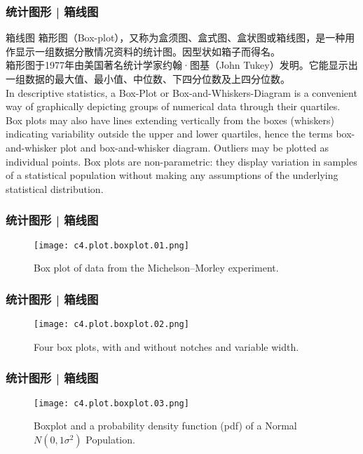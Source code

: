 \begin{frame}
  \frametitle{统计图形 | 箱线图}
  \begin{block}{箱线图}
    箱形图（Box-plot），又称为盒须图、盒式图、盒状图或箱线图，是一种用作显示一组数据分散情况资料的统计图。因型状如箱子而得名。\\
    \vspace{0.5em}
箱形图于1977年由美国著名统计学家约翰·图基（John Tukey）发明。它能显示出一组数据的最大值、最小值、中位数、下四分位数及上四分位数。\\
\vspace{0.5em}
In descriptive statistics, a Box-Plot or Box-and-Whiskers-Diagram is a convenient way of graphically depicting groups of numerical data through their quartiles. Box plots may also have lines extending vertically from the boxes (whiskers) indicating variability outside the upper and lower quartiles, hence the terms box-and-whisker plot and box-and-whisker diagram. Outliers may be plotted as individual points. Box plots are non-parametric: they display variation in samples of a statistical population without making any assumptions of the underlying statistical distribution.
  \end{block}
\end{frame}

\begin{frame}
  \frametitle{统计图形 | 箱线图}
  \begin{figure}
    \centering
    \texttt{[image: c4.plot.boxplot.01.png]}
    \caption{Box plot of data from the Michelson–Morley experiment.}
  \end{figure}
\end{frame}

\begin{frame}
  \frametitle{统计图形 | 箱线图}
  \begin{figure}
    \centering
    \texttt{[image: c4.plot.boxplot.02.png]}
    \caption{Four box plots, with and without notches and variable width.}
  \end{figure}
\end{frame}

\begin{frame}
  \frametitle{统计图形 | 箱线图}
  \begin{figure}
    \centering
    \texttt{[image: c4.plot.boxplot.03.png]}
    \caption{Boxplot and a probability density function (pdf) of a Normal $N(0,1\sigma^2)$ Population.}
  \end{figure}
\end{frame}

